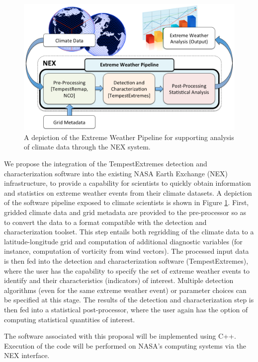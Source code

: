 \documentclass[11pt]{article}
\begin{document}
\begin{figure}
\begin{center}
\includegraphics[width=5in]{TempestPipeline.png}
\end{center}
\caption{A depiction of the Extreme Weather Pipeline for supporting analysis of climate data through the NEX system.} \label{fig:TempestPipeline}
\end{figure}

We propose the integration of the TempestExtremes detection and characterization software into the existing NASA Earth Exchange (NEX) infrastructure, to provide a capability for scientists to quickly obtain information and statistics on extreme weather events from their climate datasets.  A depiction of the software pipeline exposed to climate scientists is shown in Figure \ref{fig:TempestPipeline}.  First, gridded climate data and grid metadata are provided to the pre-processor so as to convert the data to a format compatible with the detection and characterization toolset.  This step entails both regridding of the climate data to a latitude-longitude grid and computation of additional diagnostic variables (for instance, computation of vorticity from wind vectors).  The processed input data is then fed into the detection and characterization software (TempestExtremes), where the user has the capability to specify the set of extreme weather events to identify and their characteristics (indicators) of interest.  Multiple detection algorithms (even for the same extreme weather event) or parameter choices can be specified at this stage.  The results of the detection and characterization step is then fed into a statistical post-processor, where the user again has the option of computing statistical quantities of interest.

The software associated with this proposal will be implemented using C++.  Execution of the code will be performed on NASA's computing systems via the NEX interface.
\end{document}
